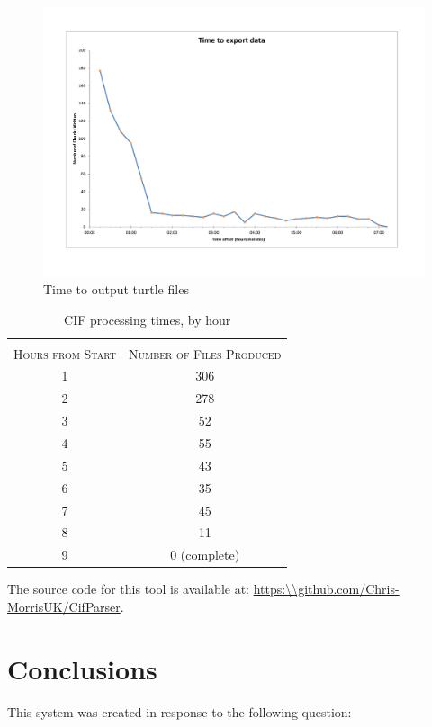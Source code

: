 {\parindent0pt
 \begin{figure}
\myfloatalign
\hspace*{-1cm}   
\includegraphics[max width=1.3\textwidth]{gfx/FilesEvery15}
\caption{Time to output turtle files}
\label{fig:cifparsing}
\end{figure}

 
\begin{table}
\begin{tabularx}{4in}{@{}cc@{}} 
\arrayrulecolor{LightSteelBlue}
\toprule \\
\textsc{Hours from Start} &  \textsc{Number of Files Produced} \\
\midrule[\heavyrulewidth]
1 & 306 \\
2 & 278\\
3 & 52\\
4 & 55\\
5 & 43\\
6 & 35\\
7 & 45\\
8 & 11\\
9 & 0 (complete)\\
\bottomrule
\end{tabularx}
\caption{CIF processing times, by hour}\label{tab:cif}
\end{table}
}


The source code for this tool is available at: \url{https:\\github.com/Chris-MorrisUK/CifParser}.

\section{Conclusions}
\label{sec:cifconclusions}
This system was created in response to the following question: \textit{\QuestionOtherData}


